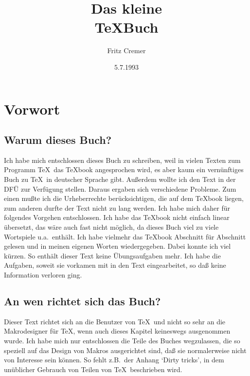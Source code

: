 \pagestyle{headings}
\makeindex
%
%
%
%
%

\title{Das kleine\\[1ex] {\Huge\bf \TeX Buch}}
\author{Fritz Cremer}
\date{5.7.1993}
\maketitle
\chapter*{Vorwort}
\section*{Warum dieses Buch?}
Ich habe mich entschlossen dieses Buch zu schreiben, weil in vielen Texten zum
Programm \TeX\ das \TeX book angesprochen wird, es aber kaum ein vern\"unftiges
Buch zu \TeX\ in deutscher Sprache gibt. Au\ss{}erdem wollte ich den Text in der
DF\"U zur Verf\"ugung stellen. Daraus ergaben sich verschiedene Probleme. Zum
einen mu\ss{}te ich die Urheberrechte ber\"uck\-sich\-tigen, die auf dem \TeX book
liegen, zum anderen durfte der Text nicht zu lang werden. Ich habe mich daher
f\"ur folgendes Vorgehen entschlossen. Ich habe das \TeX book nicht einfach
linear \"ubersetzt, das w\"are auch fast nicht m\"oglich, da dieses Buch viel zu
viele Wortspiele u.a.\ enth\"alt. Ich habe vielmehr das \TeX book Abschnitt f\"ur
Abschnitt gelesen und in meinen eigenen Worten wiedergegeben. Dabei konnte ich viel
k\"urzen. So enth\"alt dieser Text keine \"Ubungsaufgaben mehr. Ich habe die
Aufgaben, soweit sie vorkamen mit in den Text eingearbeitet, so da\ss{} keine
Information verloren ging.
\section*{An wen richtet sich das Buch?}
Dieser Text richtet sich an die Benutzer von \TeX\ und nicht so sehr
an die 
Makrodesigner f\"ur \TeX, wenn auch dieses Kapitel keineswegs
ausgenommen wurde. Ich habe mich nur entschlossen die Teile des Buches
wegzulassen, die so speziell auf das Design von Makros ausgerichtet
sind, da\ss{} sie normalerweise nicht von Interesse sein k\"onnen. So fehlt
z.B.\ der Anhang `Dirty tricks', in dem un\"ublicher Gebrauch von Teilen von 
\TeX\ beschrieben wird.
